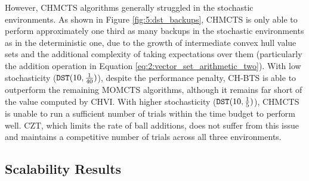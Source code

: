     However, CHMCTS algorithms generally struggled in the stochastic environments. As shown in Figure \ref{fig:5:dst_backups}, CHMCTS is only able to perform approximately one third as many backups in the stochastic environments as in the deterministic one, due to the growth of intermediate convex hull value sets and the additional complexity of taking expectations over them (particularly the addition operation in Equation \eqref{eq:2:vector_set_arithmetic_two}). With low stochasticity (${\textnormal{\texttt{DST}}}(10,\frac{1}{40})$), despite the performance penalty, CH-BTS is able to outperform the remaining MOMCTS algorithms, although it remains far short of the value computed by CHVI. With higher stochasticity (${\textnormal{\texttt{DST}}}(10,\frac{1}{5})$), CHMCTS is unable to run a sufficient number of trials within the time budget to perform well. CZT, which limits the rate of ball additions, does not suffer from this issue and maintains a competitive number of trials across all three environments.







\subsection{Scalability Results}
\label{sec:5-5-4-scalability}

